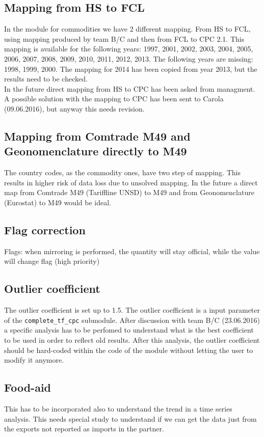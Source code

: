\documentclass[nojss]{jss}\usepackage[]{graphicx}\usepackage[]{color}
\begin{document}
\subsection{Mapping from HS to FCL}
In the module for commodities we have 2 different mapping. From HS to FCL, using mapping produced by team B/C and then from FCL to CPC 2.1. This mapping is available for the following years: 1997, 2001, 2002, 2003, 2004, 2005, 2006, 2007, 2008, 2009, 2010, 2011, 2012, 2013. The following years are missing: 1998, 1999, 2000. The mapping for 2014 has been copied from year 2013, but the results need to be checked.\\
In the future direct mapping from HS to CPC has been asked from managment. A possible solution with the mapping to CPC has been sent to Carola (09.06.2016), but anyway this needs revision.

\subsection{Mapping from Comtrade M49 and Geonomenclature directly to M49}
The country codes, as the commodity ones, have two step of mapping. This results in higher risk of data loss due to unsolved mapping. In the future a direct map from Comtrade M49 (Tariffline UNSD) to M49 and from Geonomenclature (Eurostat) to M49 would be ideal.

\subsection{Flag correction}
Flags: when mirroring is performed, the quantity will stay official, while the value will change flag (high priority)

\subsection{Outlier coefficient}
The outlier coefficient is set up to 1.5. The outlier coefficient is a input parameter of the {\tt complete\_tf\_cpc} submodule. After discussion with team B/C (23.06.2016) a specific analysis has to be perfomed to understand what is the best coefficient to be used in order to reflect old results. After this analysis, the outlier coefficient should be hard-coded within the code of the module without letting the user to modify it anymore.


\subsection{Food-aid}
This has to be incorporated also to understand the trend in a time series analysis. This needs special study to understand if we can get the data just from the exports not reported as imports in the partner.
\end{document}
